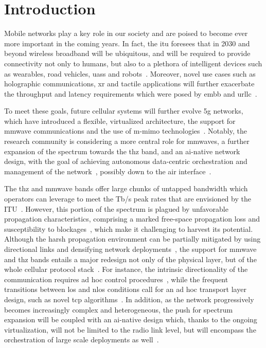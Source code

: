 \chapter{Introduction}

Mobile networks play a key role in our society and are poised to become ever more important in the coming years. In fact, the \gls{itu} foresees that in 2030 and beyond wireless broadband will be ubiquitous, and will be required to provide connectivity not only to humans, but also to a plethora of intelligent devices such as wearables, road vehicles, \glspl{uas} and robots~\cite{imt2030}. Moreover, novel use cases such as holographic communications, \gls{xr} and tactile applications will further exacerbate the throughput and latency requirements which were posed by \gls{embb} and \gls{urllc}~\cite{itu-r-2083}.

To meet these goals, future cellular systems will further evolve \gls{5g} networks,
which have introduced a flexible, virtualized architecture, the support for \gls{mmwave} communications and the use of \gls{m-mimo} technologies~\cite{ghosh20195g}. Notably, the research community is considering a more central role for \glspl{mmwave}, a further expansion of the spectrum towards the \gls{thz} band, and an \gls{ai}-native network design, with the goal of achieving autonomous data-centric orchestration and management of the network~\cite{polese20216g}, possibly down to the air interface~\cite{hoydis2021toward}.

The \gls{thz} and \gls{mmwave} bands offer large chunks of untapped bandwidth which operators can leverage to meet the Tb/s peak rates that are envisioned by the ITU~\cite{imt2030}. However, this portion of the spectrum is plagued by unfavorable propagation characteristics, comprising a marked free-space propagation loss and susceptibility to blockages~\cite{han2018propagation, jornet2011channel}, which make it challenging to harvest its potential. Although the harsh propagation environment can be partially mitigated by using directional links 
and densifying network deployments~\cite{polese2020toward}, 
the support for \gls{mmwave} and \gls{thz} bands entails a major redesign not only of the physical layer, but of the whole cellular protocol stack~\cite{shafi2018microwave}. For instance, the intrinsic directionality of the communication requires ad hoc control procedures~\cite{heng2021six}, while the frequent transitions between \gls{los} and \gls{nlos} conditions call for an ad hoc transport layer design, such as novel \gls{tcp} algorithms~\cite{zhang2019will}. 
In addition, as the network progressively becomes increasingly complex and heterogeneous, the push for spectrum expansion will be coupled with an \gls{ai}-native design which, thanks to the ongoing virtualization, will not be limited to the radio link level, but will encompass the orchestration of large scale deployments as well~\cite{polese2023understanding}.


